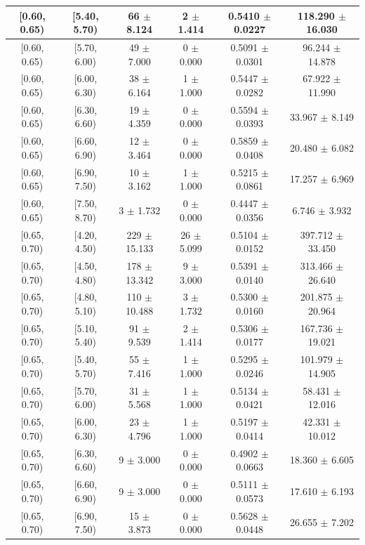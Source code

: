 \begin{longtable}{|c|c|c|c|c|c|}
\hline
[0.60, 0.65) & [5.40, 5.70) & 66 $\pm$ 8.124 & 2 $\pm$ 1.414 & 0.5410 $\pm$ 0.0227 & 118.290 $\pm$ 16.030 \\ 
\hline
[0.60, 0.65) & [5.70, 6.00) & 49 $\pm$ 7.000 & 0 $\pm$ 0.000 & 0.5091 $\pm$ 0.0301 & 96.244 $\pm$ 14.878 \\ 
\hline
[0.60, 0.65) & [6.00, 6.30) & 38 $\pm$ 6.164 & 1 $\pm$ 1.000 & 0.5447 $\pm$ 0.0282 & 67.922 $\pm$ 11.990 \\ 
\hline
[0.60, 0.65) & [6.30, 6.60) & 19 $\pm$ 4.359 & 0 $\pm$ 0.000 & 0.5594 $\pm$ 0.0393 & 33.967 $\pm$ 8.149 \\ 
\hline
[0.60, 0.65) & [6.60, 6.90) & 12 $\pm$ 3.464 & 0 $\pm$ 0.000 & 0.5859 $\pm$ 0.0408 & 20.480 $\pm$ 6.082 \\ 
\hline
[0.60, 0.65) & [6.90, 7.50) & 10 $\pm$ 3.162 & 1 $\pm$ 1.000 & 0.5215 $\pm$ 0.0861 & 17.257 $\pm$ 6.969 \\ 
\hline
[0.60, 0.65) & [7.50, 8.70) & 3 $\pm$ 1.732 & 0 $\pm$ 0.000 & 0.4447 $\pm$ 0.0356 & 6.746 $\pm$ 3.932 \\ 
\hline
[0.65, 0.70) & [4.20, 4.50) & 229 $\pm$ 15.133 & 26 $\pm$ 5.099 & 0.5104 $\pm$ 0.0152 & 397.712 $\pm$ 33.450 \\ 
\hline
[0.65, 0.70) & [4.50, 4.80) & 178 $\pm$ 13.342 & 9 $\pm$ 3.000 & 0.5391 $\pm$ 0.0140 & 313.466 $\pm$ 26.640 \\ 
\hline
[0.65, 0.70) & [4.80, 5.10) & 110 $\pm$ 10.488 & 3 $\pm$ 1.732 & 0.5300 $\pm$ 0.0160 & 201.875 $\pm$ 20.964 \\ 
\hline
[0.65, 0.70) & [5.10, 5.40) & 91 $\pm$ 9.539 & 2 $\pm$ 1.414 & 0.5306 $\pm$ 0.0177 & 167.736 $\pm$ 19.021 \\ 
\hline
[0.65, 0.70) & [5.40, 5.70) & 55 $\pm$ 7.416 & 1 $\pm$ 1.000 & 0.5295 $\pm$ 0.0246 & 101.979 $\pm$ 14.905 \\ 
\hline
[0.65, 0.70) & [5.70, 6.00) & 31 $\pm$ 5.568 & 1 $\pm$ 1.000 & 0.5134 $\pm$ 0.0421 & 58.431 $\pm$ 12.016 \\ 
\hline
[0.65, 0.70) & [6.00, 6.30) & 23 $\pm$ 4.796 & 1 $\pm$ 1.000 & 0.5197 $\pm$ 0.0414 & 42.331 $\pm$ 10.012 \\ 
\hline
[0.65, 0.70) & [6.30, 6.60) & 9 $\pm$ 3.000 & 0 $\pm$ 0.000 & 0.4902 $\pm$ 0.0663 & 18.360 $\pm$ 6.605 \\ 
\hline
[0.65, 0.70) & [6.60, 6.90) & 9 $\pm$ 3.000 & 0 $\pm$ 0.000 & 0.5111 $\pm$ 0.0573 & 17.610 $\pm$ 6.193 \\ 
\hline
[0.65, 0.70) & [6.90, 7.50) & 15 $\pm$ 3.873 & 0 $\pm$ 0.000 & 0.5628 $\pm$ 0.0448 & 26.655 $\pm$ 7.202 \\ 

\end{longtable}
